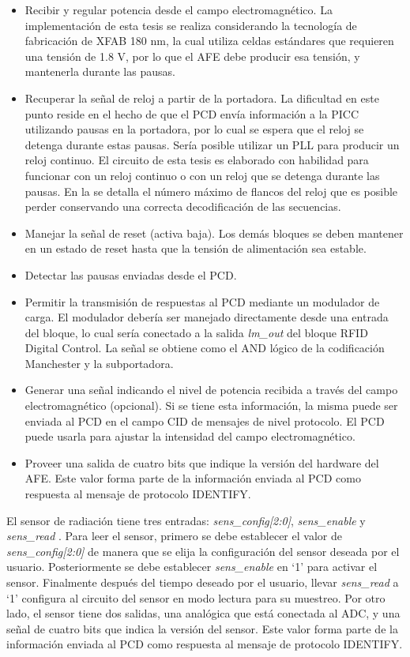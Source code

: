 \documentclass[a4paper, twoside, 11pt]{report}
\begin{document}
\begin{itemize}
  \item Recibir y regular potencia desde el campo electromagnético. La implementación de esta tesis se realiza considerando la tecnología de fabricación de XFAB 180 nm, la cual utiliza celdas estándares que requieren una tensión de 1.8 V, por lo que el AFE debe producir esa tensión, y mantenerla durante las pausas.
  \item Recuperar la señal de reloj a partir de la portadora. La dificultad en este punto reside en el hecho de que el PCD envía información a la PICC utilizando pausas en la portadora, por lo cual se espera que el reloj se detenga durante estas pausas. Sería posible utilizar un PLL para producir un reloj continuo. El circuito de esta tesis es elaborado con habilidad para funcionar con un reloj continuo o con un reloj que se detenga durante las pausas. En la  se detalla el número máximo de flancos del reloj que es posible perder conservando una correcta decodificación de las secuencias.
  \item Manejar la señal de reset (activa baja). Los demás bloques se deben mantener en un estado de reset hasta que la tensión de alimentación sea estable.
  \item Detectar las pausas enviadas desde el PCD.
  \item Permitir la transmisión de respuestas al PCD mediante un modulador de carga. El modulador debería ser manejado directamente desde una entrada del bloque, lo cual sería conectado a la salida \textit{lm\_out} del bloque RFID Digital Control. La señal se obtiene como el AND lógico de la codificación Manchester y la subportadora.
  \item Generar una señal indicando el nivel de potencia recibida a través del campo electromagnético (opcional). Si se tiene esta información, la misma puede ser enviada al PCD en el campo CID de mensajes de nivel protocolo. El PCD puede usarla para ajustar la intensidad del campo electromagnético.
  \item Proveer una salida de cuatro bits que indique la versión del hardware del AFE. Este valor forma parte de la información enviada al PCD como respuesta al mensaje de protocolo IDENTIFY.
\end{itemize}

El sensor de radiación tiene tres entradas: \textit{sens\_config[2:0]}, \textit{sens\_enable} y \textit{sens\_read} . Para leer el sensor, primero se debe establecer el valor de \textit{sens\_config[2:0]} de manera que se elija la configuración del sensor deseada por el usuario. Posteriormente se debe establecer \textit{sens\_enable} en ‘1’ para activar el sensor. Finalmente después del tiempo deseado por el usuario, llevar \textit{sens\_read} a ‘1’ configura al circuito del sensor en modo lectura para su muestreo. Por otro lado, el sensor tiene dos salidas, una analógica que está conectada al ADC, y una señal de cuatro bits que indica la versión del sensor. Este valor forma parte de la información enviada al PCD como respuesta al mensaje de protocolo IDENTIFY.
\end{document}
